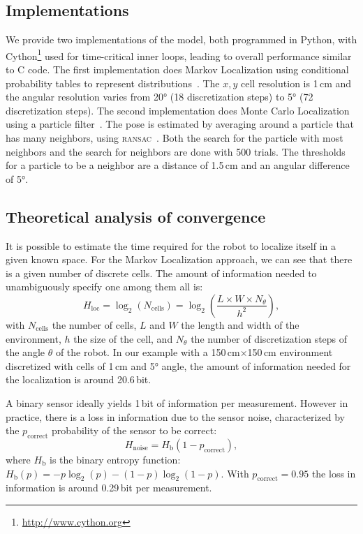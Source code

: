 \documentclass[letterpaper, 10pt, conference]{ieeeconf}
\begin{document}
\subsection{Implementations}

We provide two implementations of the model, both programmed in Python, with Cython\footnote{\url{http://www.cython.org}} used for time-critical inner loops, leading to overall performance similar to C code.
The first implementation does Markov Localization using conditional probability tables to represent distributions~\cite{fox1999markov}.
The $x,y$ cell resolution is 1\,cm and the angular resolution varies from 20° (18 discretization steps) to 5° (72 discretization steps).
The second implementation does Monte Carlo Localization using a particle filter~\cite{dellaert1999monte}.
The pose is estimated by averaging around a particle that has many neighbors, using \textsc{ransac}~\cite{Fischler1981ransac}.
Both the search for the particle with most neighbors and the search for neighbors are done with 500 trials.
The thresholds for a particle to be a neighbor are a distance of 1.5\,cm and an angular difference of 5°.

\subsection{Theoretical analysis of convergence}
\label{sec:theoreticalconv}

It is possible to estimate the time required for the robot to localize itself in a given known space.
For the Markov Localization approach, we can see that there is a given number of discrete cells.
The amount of information needed to unambiguously specify one among them all is:
\begin{displaymath}
	H_\mathrm{loc} = \log_2(N_\mathrm{cells}) = \log_2\left(\frac{L\times W\times N_{\theta}}{h^2}\right),
\end{displaymath}
with $N_\mathrm{cells}$ the number of cells, $L$ and $W$ the length and width of the environment, $h$ the size of the cell, and $N_{\theta}$ the number of discretization steps of the angle $\theta$ of the robot.
In our example with a 150\,cm$\times$150\,cm environment discretized with cells of 1\,cm and 5° angle, the amount of information needed for the localization is around 20.6\,bit.

A binary sensor ideally yields 1\,bit of information per measurement.
However in practice, there is a loss in information due to the sensor noise, characterized by the $p_\mathrm{correct}$ probability of the sensor to be correct:
\begin{displaymath}
	H_\mathrm{noise} = H_{\text{b}}(1 - p_\mathrm{correct}),
\end{displaymath}
where $H_{\text{b}}$ is the binary entropy function: $H_{\text{b}}(p) = -p\log_2(p) - (1-p)\log_2(1-p)$.
With $p_\mathrm{correct}=0.95$ the loss in information is around 0.29\,bit per measurement.
\end{document}
